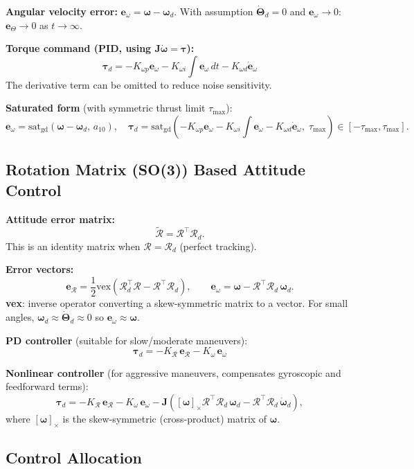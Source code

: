 \documentclass[11pt,a4paper]{article}
\newcommand{\vect}[1]{\bm{#1}}
\newcommand{\satgd}{\mathrm{sat}_\mathrm{gd}}
\newcommand{\vex}{\mathrm{vex}}
\begin{document}
\textbf{Angular velocity error:} $\vect{e}_\omega = \vect\omega - \vect\omega_d$.
With assumption $\dot{\vect\Theta}_d=0$ and $\vect{e}_\omega\to 0$:
$\vect{e}_\Theta\to 0$ as $t\to\infty$.

\textbf{Torque command (PID, using $\mathbf{J}\dot{\vect\omega}=\vect\tau$):}
\[
\boxed{
\vect\tau_d = -K_{\omega p}\vect{e}_\omega - K_{\omega i}\int\vect{e}_\omega\,dt - K_{\omega d}\dot{\vect{e}}_\omega
}
\]
The derivative term can be omitted to reduce noise sensitivity.

\textbf{Saturated form} (with symmetric thrust limit $\tau_{\max}$):
\[
\vect{e}_\omega = \satgd(\vect\omega-\vect\omega_d,\,a_{10}),\quad
\vect\tau_d = \satgd\!\left(-K_{\omega p}\vect{e}_\omega - K_{\omega i}\int\vect{e}_\omega - K_{\omega d}\dot{\vect{e}}_\omega,\;\tau_{\max}\right)
\in[-\tau_{\max},\tau_{\max}].
\]

\subsection{Rotation Matrix (SO(3)) Based Attitude Control}

\textbf{Attitude error matrix:}
\[
\tilde{\mathcal{R}} = \mathcal{R}^\top\mathcal{R}_d.
\]
This is an identity matrix when $\mathcal{R}=\mathcal{R}_d$ (perfect tracking).

\textbf{Error vectors:}
\[
\vect{e}_\mathcal{R} = \frac{1}{2}\vex\!\left(\mathcal{R}_d^\top\mathcal{R} - \mathcal{R}^\top\mathcal{R}_d\right),
\qquad
\vect{e}_\omega = \vect\omega - \mathcal{R}^\top\mathcal{R}_d\,\vect\omega_d.
\]
\textbf{vex}: inverse operator converting a skew-symmetric matrix to a vector.
For small angles, $\vect\omega_d\approx\dot{\vect\Theta}_d\approx 0$ so $\vect{e}_\omega\approx\vect\omega$.

\textbf{PD controller} (suitable for slow/moderate maneuvers):
\[
\boxed{\vect\tau_d = -K_\mathcal{R}\,\vect{e}_\mathcal{R} - K_\omega\,\vect{e}_\omega}
\]

\textbf{Nonlinear controller} (for aggressive maneuvers, compensates gyroscopic and feedforward terms):
\[
\vect\tau_d = -K_\mathcal{R}\,\vect{e}_\mathcal{R} - K_\omega\,\vect{e}_\omega
- \mathbf{J}\!\left([\vect\omega]_\times\mathcal{R}^\top\mathcal{R}_d\,\vect\omega_d - \mathcal{R}^\top\mathcal{R}_d\,\dot{\vect\omega}_d\right),
\]
where $[\vect\omega]_\times$ is the skew-symmetric (cross-product) matrix of $\vect\omega$.

\subsection{Control Allocation}
\end{document}
